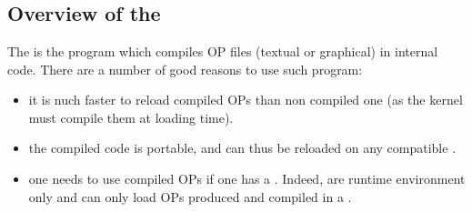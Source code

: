 
\part{\OPC{}}

\chapter*{Overview of the \OPC{}}


The \OPC{}  is the program which compiles OP files (textual or graphical) in 
\OPRS{} internal code. There are a number of good reasons to use such
program:

\begin{itemize}
  
\item it is nuch faster to reload compiled OPs than non compiled one (as the
  kernel must compile them at loading time).

\item the compiled code is portable, and can thus be reloaded on any
  compatible \CPK{}.

\item one needs to use compiled OPs if one has a \COPRSAE{}. Indeed,
  \COPRSAE{} are runtime environment only and can only load OPs produced and
  compiled in a \COPRSDE{}.

\end{itemize}

